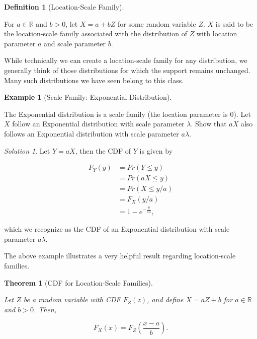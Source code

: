 \documentclass[
  letterpaper,
  DIV=11,
  numbers=noendperiod]{scrreprt}
\theoremstyle{definition}
\newtheorem{definition}{Definition}[chapter]
\theoremstyle{plain}
\newtheorem{theorem}{Theorem}[chapter]
\theoremstyle{definition}
\newtheorem{example}{Example}[chapter]
\theoremstyle{remark}
\newtheorem*{solution}{Solution}
\begin{document}
\begin{definition}[Location-Scale
Family]\protect\hypertarget{def-location-scale}{}\label{def-location-scale}

For \(a \in \mathbb{R}\) and \(b > 0\), let \(X = a + bZ\) for some
random variable \(Z\). \(X\) is said to be the location-scale family
associated with the distribution of \(Z\) with location parameter \(a\)
and scale parameter \(b\).

\end{definition}

While technically we can create a location-scale family for any
distribution, we generally think of those distributions for which the
support remains unchanged. Many such distributions we have seen belong
to this class.

\begin{example}[Scale Family: Exponential
Distribution]\protect\hypertarget{exm-exponential-scale}{}\label{exm-exponential-scale}

The Exponential distribution is a scale family (the location parameter
is 0). Let \(X\) follow an Exponential distribution with scale parameter
\(\lambda\). Show that \(aX\) also follows an Exponential distribution
with scale parameter \(a\lambda\).

\end{example}

\begin{solution}
Let \(Y = aX\), then the CDF of \(Y\) is given by

\[
\begin{aligned}
  F_Y(y)
    &= Pr(Y \leq y) \\
    &= Pr(aX \leq y) \\
    &= Pr(X \leq y/a) \\
    &= F_X(y/a) \\
    &= 1 - e^{-\frac{y}{a\lambda}},
\end{aligned}
\]

which we recognize as the CDF of an Exponential distribution with scale
parameter \(a\lambda\).
\end{solution}

The above example illustrates a very helpful result regarding
location-scale families.

\begin{theorem}[CDF for Location-Scale
Families]\protect\hypertarget{thm-location-scale}{}\label{thm-location-scale}

Let \(Z\) be a random variable with CDF \(F_Z(z)\), and define
\(X = aZ + b\) for \(a \in \mathbb{R}\) and \(b > 0\). Then,

\[F_X(x) = F_Z\left(\frac{x - a}{b}\right).\]

\end{theorem}
\end{document}
